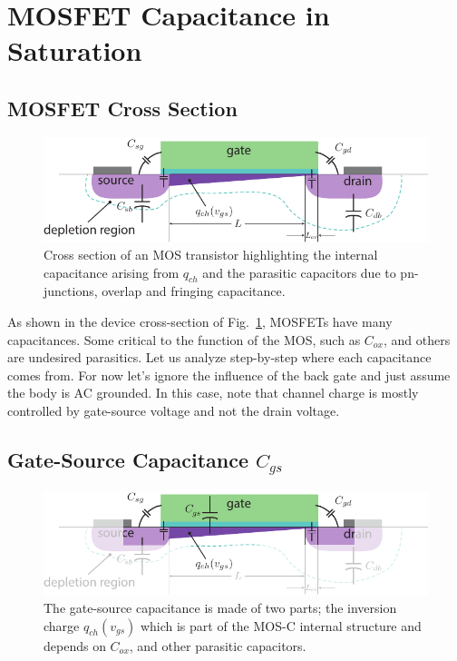 \section{MOSFET Capacitance in Saturation}
\subsection{MOSFET Cross Section}
\begin{figure}[tb]
\begin{center}
\includegraphics[width=.75\columnwidth]{mos_caps_xsect}
\end{center}
\caption{Cross section of an MOS transistor highlighting the internal capacitance arising from $q_{ch}$ and the parasitic capacitors due to pn-junctions, overlap and fringing capacitance.} \label{fig:moscapsxsect}
\end{figure}

As shown in the device cross-section of Fig.~\ref{fig:moscapsxsect}, MOSFETs have many capacitances. Some critical to the function of the MOS, such as $C_{ox}$, and others are undesired parasitics.  Let us analyze step-by-step where each capacitance comes from.  For now let's ignore the influence of the back gate and just assume the body is AC grounded. In this case, note that channel charge is mostly controlled by gate-source voltage and not the drain voltage.  
\subsection{Gate-Source Capacitance $C_{gs}$}
\begin{figure}[tb]
\begin{center}
\includegraphics[width=.75\columnwidth]{mos_caps_Cgs}
\end{center}
\caption{The gate-source capacitance is made of two parts; the inversion charge $q_{ch}(v_{gs})$ which is part of the MOS-C internal structure and depends on $C_{ox}$, and other parasitic capacitors.} \label{fig:mos_caps_Cgs}
\end{figure}

